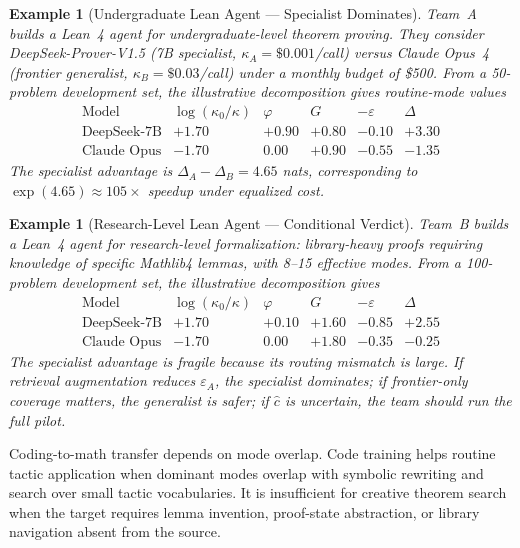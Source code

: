 \documentclass[10pt]{article}
\theoremstyle{paperplain}
\theoremstyle{paperdefinition}
\theoremstyle{paperremark}
\newtheorem{example}[theorem]{Example}
\begin{document}
\begin{example}[Undergraduate Lean Agent --- Specialist Dominates]
\label{ex:undergraduate}
Team~A builds a Lean~4 agent for undergraduate-level theorem proving.
They consider DeepSeek-Prover-V1.5 (7B specialist, $\kappa_A = \$0.001$/call)
versus Claude Opus~4 (frontier generalist, $\kappa_B = \$0.03$/call)
under a monthly budget of \$500.
From a 50-problem development set, the illustrative decomposition gives routine-mode values
\[
\begin{array}{lrrrrr}
\text{Model} & \log(\kappa_0/\kappa) & \varphi & G & -\varepsilon & \Delta\\
\hline
\text{DeepSeek-7B} & +1.70 & +0.90 & +0.80 & -0.10 & +3.30\\
\text{Claude Opus} & -1.70 & 0.00 & +0.90 & -0.55 & -1.35
\end{array}
\]
The specialist advantage is $\Delta_A-\Delta_B=4.65$ nats, corresponding to $\exp(4.65)\approx 105\times$ speedup under equalized cost.
\end{example}

\begin{example}[Research-Level Lean Agent --- Conditional Verdict]
\label{ex:research-level}
Team~B builds a Lean~4 agent for research-level formalization:
library-heavy proofs requiring knowledge of specific Mathlib4 lemmas,
with 8--15 effective modes.
From a 100-problem development set, the illustrative decomposition gives
\[
\begin{array}{lrrrrr}
\text{Model} & \log(\kappa_0/\kappa) & \varphi & G & -\varepsilon & \Delta\\
\hline
\text{DeepSeek-7B} & +1.70 & +0.10 & +1.60 & -0.85 & +2.55\\
\text{Claude Opus} & -1.70 & 0.00 & +1.80 & -0.35 & -0.25
\end{array}
\]
The specialist advantage is fragile because its routing mismatch is large. If retrieval augmentation reduces $\varepsilon_A$, the specialist dominates; if frontier-only coverage matters, the generalist is safer; if $\hat c$ is uncertain, the team should run the full pilot.
\end{example}

Coding-to-math transfer depends on mode overlap. Code training helps routine tactic application when dominant modes overlap with symbolic rewriting and search over small tactic vocabularies. It is insufficient for creative theorem search when the target requires lemma invention, proof-state abstraction, or library navigation absent from the source.
\end{document}

